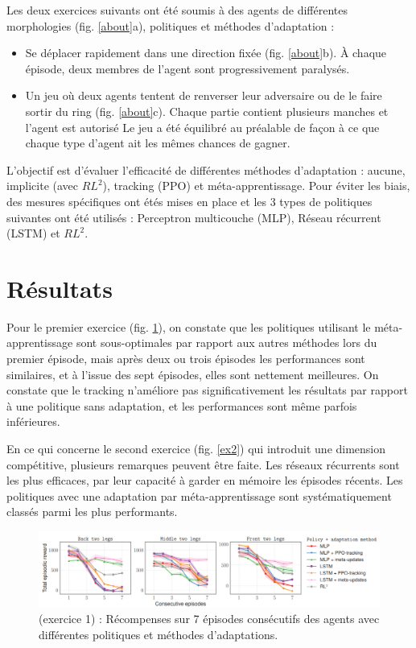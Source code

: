 \documentclass[a4paper,11pt]{article}
\begin{document}
    Les deux exercices suivants ont été soumis à des agents de différentes morphologies (fig. \ref{about}a), 
    politiques et méthodes d'adaptation :  

    \begin{itemize}
      \item{
        Se déplacer rapidement dans une direction fixée (fig. \ref{about}b). 
        À chaque épisode, deux membres de l'agent sont progressivement paralysés. 
      }
      \item{
        Un jeu où deux agents tentent de renverser leur adversaire ou de le faire sortir du ring (fig. \ref{about}c). 
        Chaque partie contient plusieurs manches et l'agent est autorisé  Le jeu a été équilibré au préalable de façon à ce 
        que chaque type d'agent ait les mêmes chances de gagner.
      }
    \end{itemize}

    L'objectif est d'évaluer l'efficacité de différentes méthodes d'adaptation : 
    aucune, implicite (avec $RL^2$), tracking (PPO) et méta-apprentissage. Pour éviter les biais, 
    des mesures spécifiques ont étés mises en place et les 3 types de politiques suivantes ont été 
    utilisés : Perceptron multicouche (MLP), Réseau récurrent (LSTM) et $RL^2$.
    
    \section{Résultats}

    Pour le premier exercice (fig. \ref{ex1}), on constate que les politiques utilisant le méta-apprentissage sont 
    sous-optimales par rapport aux autres méthodes lors du premier épisode, mais après deux ou trois 
    épisodes les performances sont similaires, et à l'issue des sept épisodes, elles sont nettement meilleures.
    On constate que le tracking n'améliore pas significativement les résultats par rapport à une politique sans adaptation, 
    et les performances sont même parfois inférieures.

    En ce qui concerne le second exercice (fig. \ref{ex2}) qui introduit une dimension compétitive, plusieurs remarques 
    peuvent être faite. Les réseaux récurrents sont les plus efficaces, par leur capacité à garder en mémoire les épisodes récents.
    Les politiques avec une adaptation par méta-apprentissage sont systématiquement classés parmi les plus performants.

    \begin{figure}[h]
      \centering
      \includegraphics[width=\textwidth]{fig2.png}
      \caption{(exercice 1) : Récompenses sur 7 épisodes consécutifs des agents avec différentes politiques et méthodes d'adaptations.}
      \label{ex1}
    \end{figure}
\end{document}
